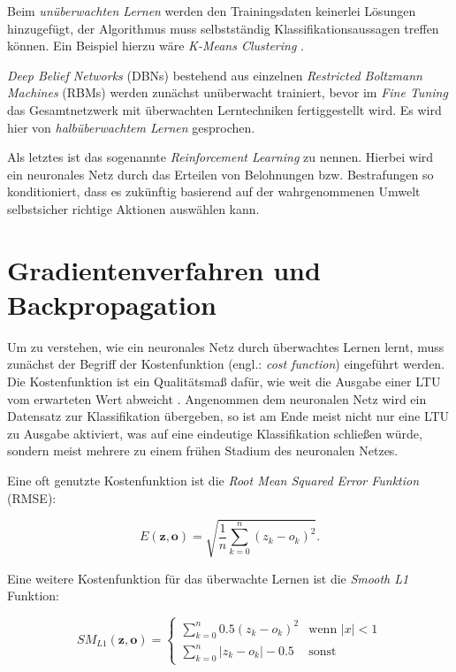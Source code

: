 Beim \textit{unüberwachten Lernen} werden den Trainingsdaten keinerlei Lösungen hinzugefügt, der Algorithmus muss selbstständig Klassifikationsaussagen treffen können. Ein Beispiel hierzu wäre \textit{K-Means Clustering} \cite{AurelienGeron.2018}. 

\textit{Deep Belief Networks} (DBNs) bestehend aus einzelnen \textit{Restricted Boltzmann Machines} (RBMs) werden zunächst unüberwacht trainiert, bevor im \textit{Fine Tuning} das Gesamtnetzwerk mit überwachten Lerntechniken fertiggestellt wird. Es wird hier von \textit{halbüberwachtem Lernen} gesprochen.

Als letztes ist das sogenannte \textit{Reinforcement Learning} zu nennen. Hierbei wird ein neuronales Netz durch das Erteilen von Belohnungen bzw. Bestrafungen so konditioniert, dass es zukünftig basierend auf der wahrgenommenen Umwelt selbstsicher richtige Aktionen auswählen kann.

\section*{Gradientenverfahren und Backpropagation}

Um zu verstehen, wie ein neuronales Netz durch überwachtes Lernen \glqq lernt\grqq{}, muss zunächst der Begriff der Kostenfunktion (engl.: \textit{cost function}) eingeführt werden. Die Kostenfunktion ist ein Qualitätsmaß dafür, wie weit die Ausgabe einer LTU vom erwarteten Wert abweicht \cite{AurelienGeron.2018}. Angenommen dem neuronalen Netz wird ein Datensatz zur Klassifikation übergeben, so ist am Ende meist nicht nur eine LTU zu Ausgabe aktiviert, was auf eine eindeutige Klassifikation schließen würde, sondern meist mehrere zu einem frühen Stadium des neuronalen Netzes.

Eine oft genutzte Kostenfunktion ist die \textit{Root Mean Squared Error Funktion} (RMSE):

\begin{equation} \label{mse}
E(\boldsymbol{z},\boldsymbol{o}) = \sqrt{\frac{1}{n}\sum_{k=0}^n (z_k-o_k)^2}.
\end{equation}

Eine weitere Kostenfunktion für das überwachte Lernen ist die \textit{Smooth L1} Funktion:

\begin{equation}
SM_{L1}(\boldsymbol{z},\boldsymbol{o}) = \begin{cases}
\sum_{k=0}^n 0.5(z_k-o_k)^2      & \text{wenn } |x| < 1\\
\sum_{k=0}^n |z_k-o_k| - 0.5   & \text{sonst}
\end{cases}
\end{equation}

